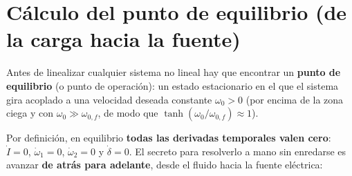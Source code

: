 \documentclass[11pt,a4paper,oneside]{book}
\begin{document}
\section{Cálculo del punto de equilibrio (de la carga hacia la fuente)}

Antes de linealizar cualquier sistema no lineal hay que encontrar un
\textbf{punto de equilibrio} (o punto de operación): un estado estacionario en
el que el sistema gira acoplado a una velocidad deseada constante $\omega_0 > 0$
(por encima de la zona ciega y con $\omega_0 \gg \omega_{0,f}$, de modo que
$\tanh(\omega_0/\omega_{0,f}) \approx 1$).

Por definición, en equilibrio \textbf{todas las derivadas temporales valen cero}:
$\dot I = 0$, $\dot\omega_1 = 0$, $\dot\omega_2 = 0$ y $\dot\delta = 0$. El
secreto para resolverlo a mano sin enredarse es avanzar \textbf{de atrás para
adelante}, desde el fluido hacia la fuente eléctrica:
\end{document}
